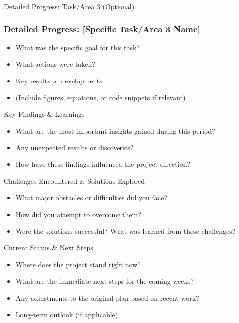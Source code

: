 \documentclass{beamer}
\begin{document}
\begin{frame}{Detailed Progress: Task/Area 3 (Optional)}
    \frametitle{Detailed Progress: [Specific Task/Area 3 Name]}
    \begin{itemize}
        \item What was the specific goal for this task?
        \item What actions were taken?
        \item Key results or developments.
        \item (Include figures, equations, or code snippets if relevant)
    \end{itemize}
\end{frame}

\begin{frame}{Key Findings \& Learnings}
    \begin{itemize}
        \item What are the most important insights gained during this period?
        \item Any unexpected results or discoveries?
        \item How have these findings influenced the project direction?
    \end{itemize}
\end{frame}

\begin{frame}{Challenges Encountered \& Solutions Explored}
    \begin{itemize}
        \item What major obstacles or difficulties did you face?
        \item How did you attempt to overcome them?
        \item Were the solutions successful? What was learned from these challenges?
    \end{itemize}
\end{frame}

\begin{frame}{Current Status \& Next Steps}
    \begin{itemize}
        \item Where does the project stand right now?
        \item What are the immediate next steps for the coming weeks?
        \item Any adjustments to the original plan based on recent work?
        \item Long-term outlook (if applicable).
    \end{itemize}
\end{frame}
\end{document}
